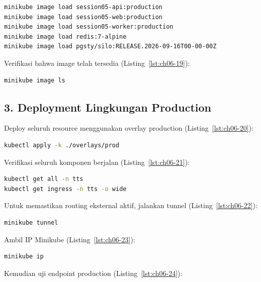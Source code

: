 \begin{lstlisting}[language=bash, caption={Mengelola klaster Minikube (3)}, label={lst:ch06-18}]
minikube image load session05-api:production
minikube image load session05-web:production
minikube image load session05-worker:production
minikube image load redis:7-alpine
minikube image load pgsty/silo:RELEASE.2026-09-16T00-00-00Z
\end{lstlisting}

Verifikasi bahwa image telah tersedia (Listing~\ref{lst:ch06-19}):

\begin{lstlisting}[language=bash, caption={Mengelola klaster Minikube (4)}, label={lst:ch06-19}]
minikube image ls
\end{lstlisting}

\subsection*{3. Deployment Lingkungan Production}

Deploy seluruh resource menggunakan overlay production (Listing~\ref{lst:ch06-20}):

\begin{lstlisting}[language=bash, caption={Menerapkan manifes Kubernetes}, label={lst:ch06-20}]
kubectl apply -k ./overlays/prod
\end{lstlisting}

Verifikasi seluruh komponen berjalan (Listing~\ref{lst:ch06-21}):

\begin{lstlisting}[language=bash, caption={Memeriksa objek Kubernetes (2)}, label={lst:ch06-21}]
kubectl get all -n tts
kubectl get ingress -n tts -o wide
\end{lstlisting}

Untuk memastikan routing eksternal aktif, jalankan tunnel (Listing~\ref{lst:ch06-22}):

\begin{lstlisting}[language=bash, caption={Perintah minikube tunnel}, label={lst:ch06-22}]
minikube tunnel
\end{lstlisting}

Ambil IP Minikube (Listing~\ref{lst:ch06-23}):

\begin{lstlisting}[language=bash, caption={Perintah minikube ip}, label={lst:ch06-23}]
minikube ip
\end{lstlisting}

Kemudian uji endpoint production (Listing~\ref{lst:ch06-24}):

